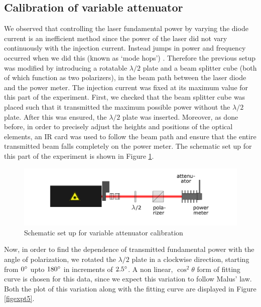 \subsection{Calibration of variable attenuator}
We observed that controlling the laser fundamental power by varying the diode current is an inefficient method since the power of the laser did not vary continuously with the injection current. Instead jumps in power and frequency occurred when we did this (known as `mode hops') \cite{UB}. Therefore the previous setup was modified by introducing a rotatable $\lambda /2$ plate and a beam splitter cube (both of which function as two polarizers), in the beam path between the laser diode and the power meter. The injection current was fixed at its maximum value for this part of the experiment. First, we checked that the beam splitter cube was placed such that it transmitted the maximum possible power without the $\lambda /2$ plate. After this was ensured, the $\lambda /2$ plate was inserted. Moreover, as done before, in order to precisely adjust the heights and positions of the optical elements, an IR card was used to follow the beam path and ensure that the entire transmitted beam falls completely on the power meter. The schematic set up for this part of the experiment is shown in Figure \ref{figexpt4}.

\begin{figure}[H]
\includegraphics[scale=0.4]{./imagesandplots/pic2.png}
\centering
\caption{Schematic set up for variable attenuator calibration \cite{UB}}
\label{figexpt4}
\end{figure}

Now, in order to find the dependence of transmitted fundamental power with the angle of polarization, we rotated the $\lambda/2$ plate in a clockwise direction, starting from $0\degree$ upto $180\degree$ in increments of $2.5\degree$. A non linear, $\cos^{2}\theta$ form of fitting curve is chosen for this data, since we expect this variation to follow Malus' law. Both the plot of this variation along with the fitting curve are displayed in Figure \ref{figexpt5}.

